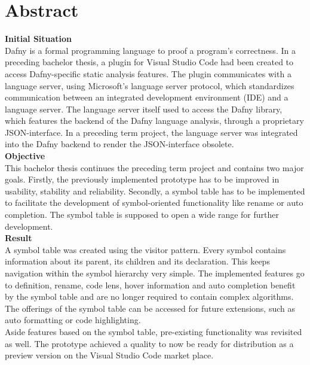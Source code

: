\section{Abstract}
\label{section:abstract}


\textbf{Initial Situation}\\
Dafny is a formal programming language to proof a program's correctness.
In a preceding bachelor thesis, a plugin for Visual Studio Code had been created to access Dafny-specific static analysis features.
The plugin communicates with a language server, using Microsoft's language server protocol, which standardizes communication between an integrated development environment (IDE) and a language server.
The language server itself used to access the Dafny library, which features the backend of the Dafny language analysis, through a proprietary JSON-interface.
In a preceding term project, the language server was integrated into the Dafny backend to render the JSON-interface obsolete.\\

\textbf{Objective}\\
This bachelor thesis continues the preceding term project and contains two major goals.
Firstly, the previously implemented prototype has to be improved in usability, stability and reliability.
Secondly, a symbol table has to be implemented to facilitate the development of symbol-oriented functionality like rename or auto completion.
The symbol table is supposed to open a wide range for further development.\\

\textbf{Result}\\
A symbol table was created using the visitor pattern.
Every symbol contains information about its parent, its children and its declaration.
This keeps navigation within the symbol hierarchy very simple.
The implemented features go to definition, rename, code lens, hover information and auto completion benefit by the symbol table and are no longer required to contain complex algorithms.
The offerings of the symbol table can be accessed for future extensions, such as auto formatting or code highlighting.\\

Aside features based on the symbol table, pre-existing functionality was revisited as well.
The prototype achieved a quality to now be ready for distribution as a preview version on the Visual Studio Code market place.
